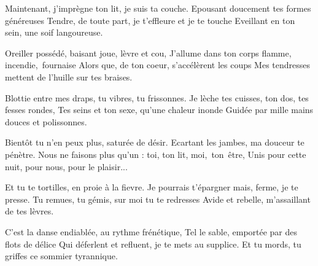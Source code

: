\bigskip
\noindent
Maintenant, j'imprègne ton lit, je suis ta couche.\pn
Epousant doucement tes formes généreuses\pn
Tendre, de toute part, je t'effleure et je te touche\pn
Eveillant en ton sein, une soif langoureuse.

\bigskip
\noindent
Oreiller possédé, baisant joue, lèvre et cou,\pn
J'allume dans ton corps flamme, \hbox{incendie, fournaise}\pn
Alors que, de ton coeur, s'accélèrent les coups\pn
Mes tendresses mettent de l'huille sur tes braises.

\bigskip
\noindent
Blottie entre mes draps, tu vibres, tu frissonnes.\pn
Je lèche tes cuisses, ton dos, tes fesses rondes,\pn
Tes seins et ton sexe, qu'une chaleur inonde\pn
Guidée par mille mains douces et polissonnes.

\bigskip
\noindent
Bientôt tu n'en peux plus, saturée de désir.\pn
Ecartant les jambes, ma douceur te pénètre.\pn
Nous ne faisons plus qu'un : toi, ton lit, \hbox{moi, ton être,}\pn
Unis pour cette nuit, pour nous, pour le plaisir...

\bigskip
\noindent
Et tu te tortilles, en proie à la fievre.\pn
Je pourrais t'épargner mais, ferme, je te presse.\pn
Tu remues, tu gémis, sur moi tu te redresses\pn
Avide et rebelle, m'assaillant de tes lèvres.

\bigskip
\noindent
C'est la danse endiablée, au rythme frénétique,\pn
Tel le sable, emportée par des flots de délice\pn
Qui déferlent et refluent, je te mets au supplice.\pn
Et tu mords, tu griffes ce sommier tyrannique. 
\onecolumn
\bye